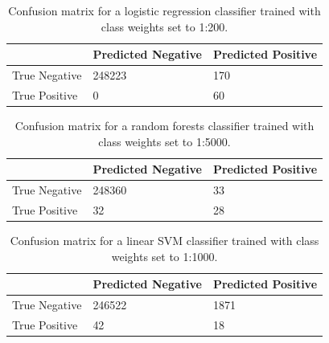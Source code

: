 \documentclass{soups}
\begin{document}
\begin{table}[t]
\centering
\begin{tabular}{@{}lll@{}}
\toprule
              & Predicted Negative & Predicted Positive \\ \midrule
True Negative & 248223             & 170                \\
True Positive & 0                  & 60                 \\ \bottomrule
\end{tabular}
\caption{Confusion matrix for a logistic regression classifier trained
with class weights set to 1:200.}
\label{fig:logistic}
\end{table}

\begin{table}[t]
\centering
\begin{tabular}{@{}lll@{}}
\toprule
              & Predicted Negative & Predicted Positive \\ \midrule
True Negative & 248360             & 33                 \\
True Positive & 32                 & 28                 \\ \bottomrule
\end{tabular}
\caption{Confusion matrix for a random forests classifier trained with
class weights set to 1:5000.}
\label{fig:rf}
\end{table}

\begin{table}[t]
\centering
\begin{tabular}{@{}lll@{}}
\toprule
              & Predicted Negative & Predicted Positive \\ \midrule
True Negative & 246522             & 1871               \\
True Positive & 42                 & 18                 \\ \bottomrule
\end{tabular}
\caption{Confusion matrix for a linear SVM classifier trained with
class weights set to 1:1000.}
\label{fig:svm}
\end{table}
\end{document}
